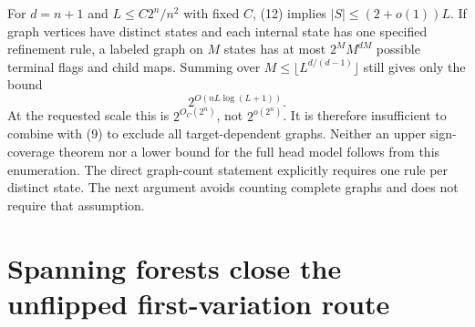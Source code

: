 \documentclass[11pt]{article}
\begin{document}
For $d=n+1$ and $L\le C2^n/n^2$ with fixed $C$, (12) implies
$|S|\le(2+o(1))L$. If graph vertices have distinct states and each
internal state has one specified refinement rule, a labeled graph on
$M$ states has at most $2^M M^{dM}$ possible terminal flags and
child maps. Summing over $M\le\lfloor L^{d/(d-1)}\rfloor$ still
gives only the bound
\[
                         2^{O(nL\log(L+1))}.
\]
At the requested scale this is $2^{O_C(2^n)}$, not $2^{o(2^n)}$.
It is therefore insufficient to combine with (9) to exclude all
target-dependent graphs. Neither an upper sign-coverage theorem nor a
lower bound for the full head model follows from this enumeration.
The direct graph-count statement explicitly requires one rule per
distinct state. The next argument avoids counting complete graphs and
does not require that assumption.

\section{Spanning forests close the unflipped first-variation route}
\end{document}
